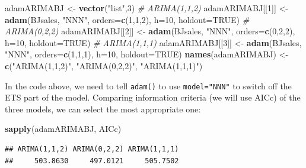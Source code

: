\documentclass[]{book}
\newenvironment{Shaded}{\begin{snugshade}}{\end{snugshade}}
\newcommand{\CommentTok}[1]{\textcolor[rgb]{0.56,0.35,0.01}{\textit{#1}}}
\newcommand{\DataTypeTok}[1]{\textcolor[rgb]{0.13,0.29,0.53}{#1}}
\newcommand{\DecValTok}[1]{\textcolor[rgb]{0.00,0.00,0.81}{#1}}
\newcommand{\KeywordTok}[1]{\textcolor[rgb]{0.13,0.29,0.53}{\textbf{#1}}}
\newcommand{\NormalTok}[1]{#1}
\newcommand{\OtherTok}[1]{\textcolor[rgb]{0.56,0.35,0.01}{#1}}
\newcommand{\StringTok}[1]{\textcolor[rgb]{0.31,0.60,0.02}{#1}}
\theoremstyle{definition}
\theoremstyle{definition}
\theoremstyle{definition}
\theoremstyle{definition}
\theoremstyle{remark}
\begin{document}
\begin{Shaded}
\begin{Highlighting}[]
\NormalTok{adamARIMABJ <-}\StringTok{ }\KeywordTok{vector}\NormalTok{(}\StringTok{"list"}\NormalTok{,}\DecValTok{3}\NormalTok{)}
\CommentTok{# ARIMA(1,1,2)}
\NormalTok{adamARIMABJ[[}\DecValTok{1}\NormalTok{]] <-}\StringTok{ }\KeywordTok{adam}\NormalTok{(BJsales, }\StringTok{"NNN"}\NormalTok{, }\DataTypeTok{orders=}\KeywordTok{c}\NormalTok{(}\DecValTok{1}\NormalTok{,}\DecValTok{1}\NormalTok{,}\DecValTok{2}\NormalTok{),}
                         \DataTypeTok{h=}\DecValTok{10}\NormalTok{, }\DataTypeTok{holdout=}\OtherTok{TRUE}\NormalTok{)}
\CommentTok{# ARIMA(0,2,2)}
\NormalTok{adamARIMABJ[[}\DecValTok{2}\NormalTok{]] <-}\StringTok{ }\KeywordTok{adam}\NormalTok{(BJsales, }\StringTok{"NNN"}\NormalTok{, }\DataTypeTok{orders=}\KeywordTok{c}\NormalTok{(}\DecValTok{0}\NormalTok{,}\DecValTok{2}\NormalTok{,}\DecValTok{2}\NormalTok{),}
                         \DataTypeTok{h=}\DecValTok{10}\NormalTok{, }\DataTypeTok{holdout=}\OtherTok{TRUE}\NormalTok{)}
\CommentTok{# ARIMA(1,1,1)}
\NormalTok{adamARIMABJ[[}\DecValTok{3}\NormalTok{]] <-}\StringTok{ }\KeywordTok{adam}\NormalTok{(BJsales, }\StringTok{"NNN"}\NormalTok{, }\DataTypeTok{orders=}\KeywordTok{c}\NormalTok{(}\DecValTok{1}\NormalTok{,}\DecValTok{1}\NormalTok{,}\DecValTok{1}\NormalTok{),}
                         \DataTypeTok{h=}\DecValTok{10}\NormalTok{, }\DataTypeTok{holdout=}\OtherTok{TRUE}\NormalTok{)}
\KeywordTok{names}\NormalTok{(adamARIMABJ) <-}\StringTok{ }\KeywordTok{c}\NormalTok{(}\StringTok{"ARIMA(1,1,2)"}\NormalTok{, }\StringTok{"ARIMA(0,2,2)"}\NormalTok{,}
                        \StringTok{"ARIMA(1,1,1)"}\NormalTok{)}
\end{Highlighting}
\end{Shaded}

In the code above, we need to tell \texttt{adam()} to use \texttt{model="NNN"} to switch off the ETS part of the model. Comparing information criteria (we will use AICc) of the three models, we can select the most appropriate one:

\begin{Shaded}
\begin{Highlighting}[]
\KeywordTok{sapply}\NormalTok{(adamARIMABJ, AICc)}
\end{Highlighting}
\end{Shaded}

\begin{verbatim}
## ARIMA(1,1,2) ARIMA(0,2,2) ARIMA(1,1,1) 
##     503.8630     497.0121     505.7502
\end{verbatim}
\end{document}
